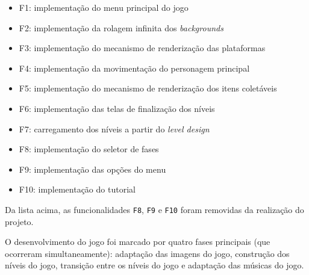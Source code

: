   \begin{itemize}
    \item F1: implementação do menu principal do jogo
    \item F2: implementação da rolagem infinita dos \textit{backgrounds}
    \item F3: implementação do mecanismo de renderização das plataformas
    \item F4: implementação da movimentação do personagem principal
    \item F5: implementação do mecanismo de renderização dos itens coletáveis
    \item F6: implementação das telas de finalização dos níveis
    \item F7: carregamento dos níveis a partir do \textit{level design}
    \item F8: implementação do seletor de fases
    \item F9: implementação das opções do menu
    \item F10: implementação do tutorial
  \end{itemize}

  Da lista acima, as funcionalidades \texttt{F8}, \texttt{F9} e \texttt{F10} foram removidas da realização do projeto.

  O desenvolvimento do jogo foi marcado por quatro fases principais (que ocorreram simultaneamente): adaptação das imagens do jogo, construção dos níveis do jogo, transição entre os níveis do jogo e adaptação das músicas do jogo.

  

  

  

  

  



